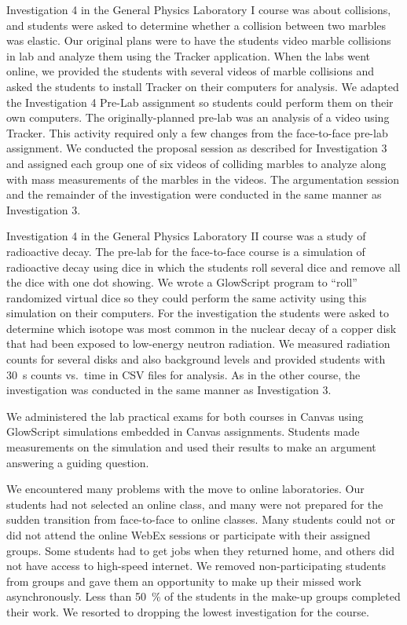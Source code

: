 \documentclass[aip, numerical, preprint]{revtex4-2}
\begin{document}
Investigation 4 in the General Physics Laboratory I course was about collisions, and students
were asked to determine whether a collision between two marbles was elastic. Our original plans
were to have the students video marble collisions in lab and analyze them using the Tracker
application\citep{bro2009}. When the labs went online, we provided the students with several
videos of marble collisions and asked the students to install Tracker on their computers for
analysis.  We adapted the Investigation 4 Pre-Lab assignment so students could perform them on
their own computers. The originally-planned pre-lab was an analysis of a video using
Tracker. This activity required only a few changes from the face-to-face pre-lab assignment. We
conducted the proposal session as described for Investigation 3 and assigned each group one of
six videos of colliding marbles to analyze along with mass measurements of the marbles in the
videos. The argumentation session and the remainder of the investigation were conducted in the
same manner as Investigation 3.

Investigation 4 in the General Physics Laboratory II course was a study of radioactive
decay. The pre-lab for the face-to-face course is a simulation of radioactive decay using dice
in which the students roll several dice and remove all the dice with one dot showing. We wrote
a GlowScript\citep{glowscript} program to ``roll'' randomized virtual dice so they could
perform the same activity using this simulation on their computers. For the investigation the
students were asked to determine which isotope was most common in the nuclear decay of a copper
disk that had been exposed to low-energy neutron radiation. We measured radiation counts for
several disks and also background levels and provided students with \SI{30}{s} counts vs.\ time
in CSV files for analysis. As in the other course, the investigation was conducted in the same
manner as Investigation 3.


We administered the lab practical exams for both courses in Canvas using GlowScript simulations
embedded in Canvas assignments. Students made measurements on the simulation and used their
results to make an argument answering a guiding question.

We encountered many problems with the move to online laboratories. Our students had not
selected an online class, and many were not prepared for the sudden transition from
face-to-face to online classes. Many students could not or did not attend the online WebEx
sessions or participate with their assigned groups. Some students had to get jobs when they
returned home, and others did not have access to high-speed internet. We removed
non-participating students from groups and gave them an opportunity to make up their missed
work asynchronously. Less than \SI{50}{\percent} of the students in the make-up groups
completed their work. We resorted to dropping the lowest investigation for the course.
\end{document}
